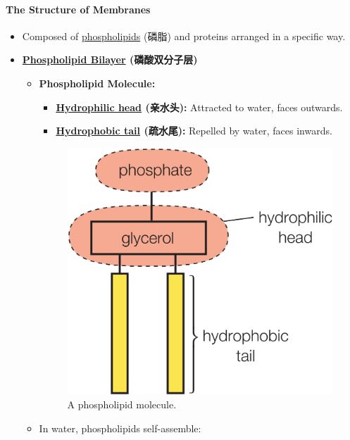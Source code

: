 \paragraph{The Structure of Membranes}
\begin{itemize}
    \item Composed of \underline{phospholipids} (磷脂) and proteins arranged in a specific way.
    \item \textbf{\underline{Phospholipid Bilayer} (磷酸双分子层)}
    \begin{itemize}
        \item \textbf{Phospholipid Molecule:}
        \begin{itemize}
            \item \textbf{\underline{Hydrophilic head} (亲水头):} Attracted to water, faces outwards.
            \item \textbf{\underline{Hydrophobic tail} (疏水尾):} Repelled by water, faces inwards.
        \end{itemize}
        \begin{figure}[H]
            \centering
            \includegraphics[scale=0.12]{Biology/2A/Images/2A-1-1.png}
            \caption{A phospholipid molecule.}
        \end{figure}
        \item In water, phospholipids self-assemble:
        \begin{itemize}

\end{itemize}
\end{itemize}
\end{itemize}
